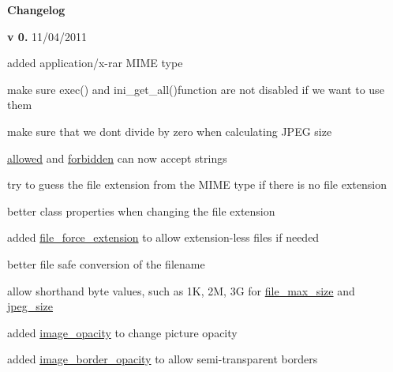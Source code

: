 {\bfseries Changelog} 
\begin{DoxyItemize}
\item {\bfseries v 0.} 11/04/2011~\newline

\begin{DoxyItemize}
\item added application/x-\/rar M\+I\+M\+E type~\newline

\item make sure exec() and ini\+\_\+get\+\_\+all()function are not disabled if we want to use them~\newline

\item make sure that we don\textquotesingle{}t divide by zero when calculating J\+P\+E\+G size~\newline

\item \hyperlink{}{allowed} and \hyperlink{}{forbidden} can now accept strings~\newline

\item try to guess the file extension from the M\+I\+M\+E type if there is no file extension~\newline

\item better class properties when changing the file extension~\newline

\item added \hyperlink{}{file\+\_\+force\+\_\+extension} to allow extension-\/less files if needed~\newline

\item better file safe conversion of the filename~\newline

\item allow shorthand byte values, such as 1\+K, 2\+M, 3\+G for \hyperlink{}{file\+\_\+max\+\_\+size} and \hyperlink{}{jpeg\+\_\+size}~\newline

\item added \hyperlink{}{image\+\_\+opacity} to change picture opacity~\newline

\item added \hyperlink{}{image\+\_\+border\+\_\+opacity} to allow semi-\/transparent borders~\newline


\end{DoxyItemize}
\end{DoxyItemize}
